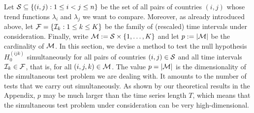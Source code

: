 \documentclass[a4paper,12pt]{article}
\numberwithin{equation}{section}
\begin{document}
Let $\mathcal{S} \subseteq \{ (i,j): 1 \le i < j \le n \}$ be the set of all pairs of countries $(i,j)$ whose trend functions $\lambda_i$ and $\lambda_j$ we want to compare. Moreover, as already introduced above, let $\mathcal{F} = \{ \mathcal{I}_k: 1 \le k \le K \}$ be the family of (rescaled) time intervals under consideration. Finally, write $\mathcal{M} := \mathcal{S} \times \{1,\ldots,K\}$ and let $p := |\mathcal{M}|$ be the cardinality of $\mathcal{M}$. In this section, we devise a method to test the null hypothesis $H_0^{(ijk)}$ simultaneously for all pairs of countries $(i,j) \in \mathcal{S}$ and all time intervals $\mathcal{I}_k \in \mathcal{F}$, that is, for all $(i,j,k) \in \mathcal{M}$. The value $p = |\mathcal{M}|$ is the dimensionality of the simultaneous test problem we are dealing with. It amounts to the number of tests that we carry out simultaneously. As shown by our theoretical results in the Appendix, $p$ may be much larger than the time series length $T$, which means that the simultaneous test problem under consideration can be very high-dimensional. 
\end{document}
